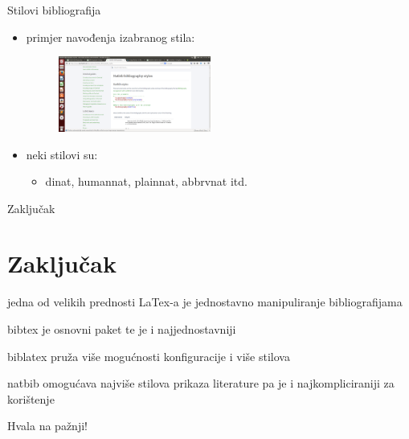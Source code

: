 \documentclass{beamer}
\begin{document}
\begin{frame}{Stilovi bibliografija}
\begin{itemize}
	\item primjer navođenja izabranog stila: \\
	\begin{figure}
	\includegraphics[width=5cm]{natbibprimjer3.png}
	\end{figure}
	\item neki stilovi su:
	\begin{itemize}
			\item dinat, humannat, plainnat, abbrvnat itd.  \\
	\end{itemize}
\end{itemize}
\end{frame}



\begin{frame}{Zaključak}
\section{Zaključak}
	\item jedna od velikih prednosti LaTex-a je jednostavno manipuliranje bibliografijama \\
	\item bibtex je osnovni paket te je i najjednostavniji \\
	\item biblatex pruža više mogućnosti konfiguracije i više stilova \\
	\item natbib omogućava najviše stilova prikaza literature pa je i najkompliciraniji za korištenje \\
\end{frame}

\begin{frame}
Hvala na pažnji!
\end{frame}
\end{document}
